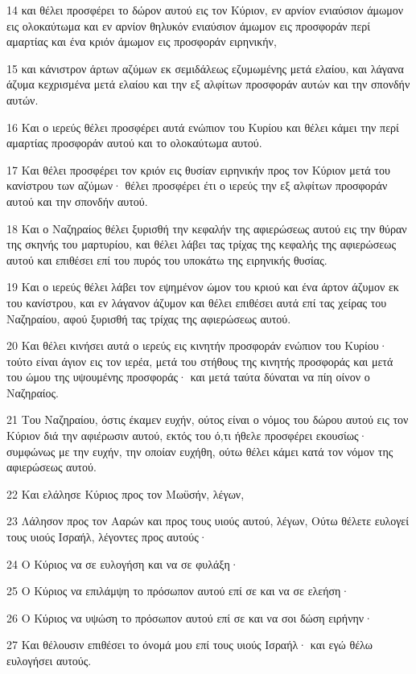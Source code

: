 \par 14 και θέλει προσφέρει το δώρον αυτού εις τον Κύριον, εν αρνίον ενιαύσιον άμωμον εις ολοκαύτωμα και εν αρνίον θηλυκόν ενιαύσιον άμωμον εις προσφοράν περί αμαρτίας και ένα κριόν άμωμον εις προσφοράν ειρηνικήν,
\par 15 και κάνιστρον άρτων αζύμων εκ σεμιδάλεως εζυμωμένης μετά ελαίου, και λάγανα άζυμα κεχρισμένα μετά ελαίου και την εξ αλφίτων προσφοράν αυτών και την σπονδήν αυτών.
\par 16 Και ο ιερεύς θέλει προσφέρει αυτά ενώπιον του Κυρίου και θέλει κάμει την περί αμαρτίας προσφοράν αυτού και το ολοκαύτωμα αυτού.
\par 17 Και θέλει προσφέρει τον κριόν εις θυσίαν ειρηνικήν προς τον Κύριον μετά του κανίστρου των αζύμων· θέλει προσφέρει έτι ο ιερεύς την εξ αλφίτων προσφοράν αυτού και την σπονδήν αυτού.
\par 18 Και ο Ναζηραίος θέλει ξυρισθή την κεφαλήν της αφιερώσεως αυτού εις την θύραν της σκηνής του μαρτυρίου, και θέλει λάβει τας τρίχας της κεφαλής της αφιερώσεως αυτού και επιθέσει επί του πυρός του υποκάτω της ειρηνικής θυσίας.
\par 19 Και ο ιερεύς θέλει λάβει τον εψημένον ώμον του κριού και ένα άρτον άζυμον εκ του κανίστρου, και εν λάγανον άζυμον και θέλει επιθέσει αυτά επί τας χείρας του Ναζηραίου, αφού ξυρισθή τας τρίχας της αφιερώσεως αυτού.
\par 20 Και θέλει κινήσει αυτά ο ιερεύς εις κινητήν προσφοράν ενώπιον του Κυρίου· τούτο είναι άγιον εις τον ιερέα, μετά του στήθους της κινητής προσφοράς και μετά του ώμου της υψουμένης προσφοράς· και μετά ταύτα δύναται να πίη οίνον ο Ναζηραίος.
\par 21 Του Ναζηραίου, όστις έκαμεν ευχήν, ούτος είναι ο νόμος του δώρου αυτού εις τον Κύριον διά την αφιέρωσιν αυτού, εκτός του ό,τι ήθελε προσφέρει εκουσίως· συμφώνως με την ευχήν, την οποίαν ευχήθη, ούτω θέλει κάμει κατά τον νόμον της αφιερώσεως αυτού.
\par 22 Και ελάλησε Κύριος προς τον Μωϋσήν, λέγων,
\par 23 Λάλησον προς τον Ααρών και προς τους υιούς αυτού, λέγων, Ούτω θέλετε ευλογεί τους υιούς Ισραήλ, λέγοντες προς αυτούς·
\par 24 Ο Κύριος να σε ευλογήση και να σε φυλάξη·
\par 25 Ο Κύριος να επιλάμψη το πρόσωπον αυτού επί σε και να σε ελεήση·
\par 26 Ο Κύριος να υψώση το πρόσωπον αυτού επί σε και να σοι δώση ειρήνην·
\par 27 Και θέλουσιν επιθέσει το όνομά μου επί τους υιούς Ισραήλ· και εγώ θέλω ευλογήσει αυτούς.

